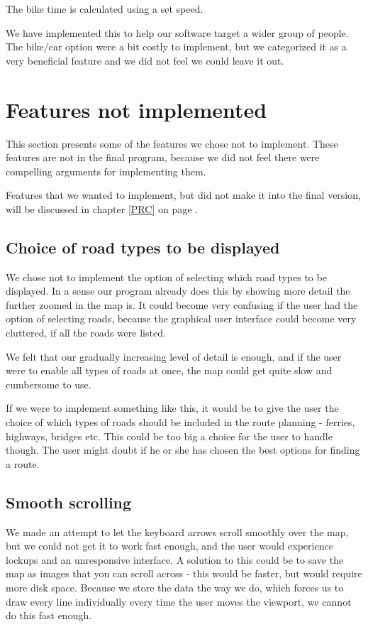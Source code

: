 The bike time is calculated using a set speed.

We have implemented this to help our software target a wider group of people.
The bike/car option were a bit costly to implement, but we categorized it as a
very beneficial feature and we did not feel we could leave it out.

\section{Features not implemented}
\label{UIA-NI}
This section presents some of the features we chose not to implement.
These features are not in the final program, because we did not feel there were
compelling arguments for implementing them.

Features that we wanted to implement, but did not make it into the final version,
will be discussed in chapter \ref{PRC}  on page
\pageref{PRC}.

\subsection{Choice of road types to be displayed}
\label{UIA-NI-CRD}
We chose not to implement the option of selecting which road types to be
displayed. In a sense our program already does this by showing more detail the
further zoomed in the map is. It could become very confusing if the user had the
option of selecting roads, because the graphical user interface could become
very cluttered, if all the roads were listed.

We felt that our gradually increasing level of detail is enough, and if the user were 
to enable all types of roads at once, the map could get quite slow and cumbersome 
to use.

If we were to implement something like this, it would be to give the user the
choice of which types of roads should be included in the route planning -
ferries, highways, bridges etc. This could be too big a choice for the user to handle though. The
user might doubt if he or she has chosen the best options for finding a route.

\subsection{Smooth scrolling}
\label{UIA-NI-SS}
We made an attempt to let the keyboard arrows scroll smoothly over the map, but
we could not get it to work fast enough, and the user would experience
lockups and an unresponsive interface. A solution to this could
be to save the map as images that you can scroll across - this would be faster,
but would require more disk space. Because we store the data the way we do, which 
forces us to draw every line individually every time the user moves the viewport, 
we cannot do this fast enough.

